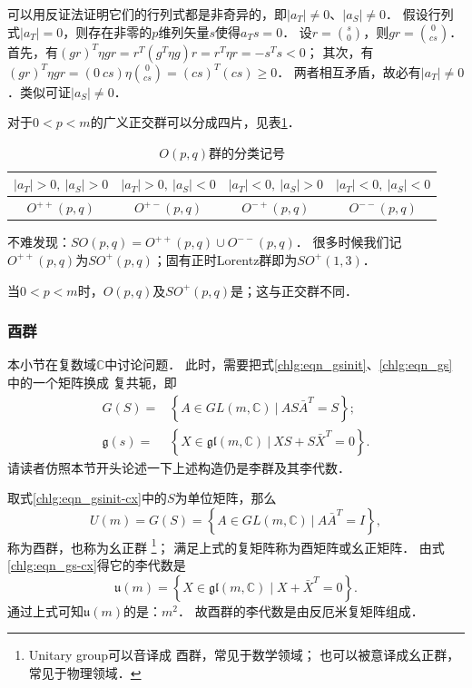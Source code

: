 可以用反证法证明它们的行列式都是非奇异的，即$|a_T| \neq 0$、$|a_S| \neq 0$．
假设行列式$|a_T| = 0$，则存在非零的$p$维列矢量$s$使得$a_T s =0$．
设$r=\binom{s}{0}$，则$gr=\binom{0}{cs}$．
首先，有$(gr)^T \eta gr = r^T (g^T \eta g) r = r^T \eta r = - s^T s <0 $；
其次，有$(gr)^T \eta gr = (0 \  cs) \eta \binom{0}{cs} = (cs)^T (cs)\geqslant 0$．
两者相互矛盾，故必有$|a_T| \neq 0$．类似可证$|a_S| \neq 0$．

对于$0 < p < m$的广义正交群可以分成四片，见表\ref{chlg:tab-GO}．

\begin{table}[htb]
    \centering
    \caption{$O(p,q)$群的分类记号} \label{chlg:tab-GO}
    \begin{tabular}{|*{4}{c|}}
        \hline 
        $| a_T| >0,\ | a_S |>0$ & $ |a_T| >0,\ | a_S |<0$ & $| a_T| <0,\ | a_S| >0$  & $| a_T| <0,\ | a_S| <0$ \\
        \hline
        $O^{++}(p,q)$ & $O^{+-}(p,q)$ & $O^{-+}(p,q)$ & $O^{--}(p,q)$   \\ 
        \hline
    \end{tabular}
\end{table}


不难发现：$SO(p,q)= O^{++}(p,q)\cup O^{--}(p,q)$．
很多时候我们记$O^{++}(p,q)$为$SO^{+}(p,q)$；固有正时Lorentz群即为$SO^{+}(1,3)$．

当$0<p<m$时，$O(p,q)$及$SO^{+}(p,q)$是；这与正交群不同．

    

\subsubsection{酉群}\label{chlg:sec_unitary}

本小节在复数域$\mathbb{C}$中讨论问题．
此时，需要把式\eqref{chlg:eqn_gsinit}、\eqref{chlg:eqn_gs}中的一个矩阵换成
复共轭，即
\begin{align}
    G(S)=& \left\{ A \in GL(m,\mathbb{C})\ |\  A S \bar{A}^T =S \right\};\label{chlg:eqn_gsinit-cx} \\
    \mathfrak{g}(s) =& \left\{ X \in \mathfrak{gl}(m,\mathbb{C}) \ |\ 
    X S + S \bar{X}^T = 0 \right\} . \label{chlg:eqn_gs-cx}
\end{align}
请读者仿照本节开头论述一下上述构造仍是李群及其李代数．

取式\eqref{chlg:eqn_gsinit-cx}中的$S$为单位矩阵，那么
\begin{equation}\label{chlg:eqn_unitary}
    U(m)=G(S)= \left\{ A \in GL(m,\mathbb{C})\ |\ A \bar{A}^T =I \right\},
\end{equation}
称为{\heiti 酉群}，也称为{\heiti 幺正群}
\footnote{Unitary group可以音译成 {\kaishu 酉群}，常见于数学领域；
    也可以被意译成{\kaishu 幺正群}，常见于物理领域．}；
满足上式的复矩阵称为{\heiti 酉矩阵}或{\heiti 幺正矩阵}．
由式\eqref{chlg:eqn_gs-cx}得它的李代数是
\begin{equation}
    \mathfrak{u}(m)= \left\{ X \in  \mathfrak{gl}(m,\mathbb{C}) \mid X  + \bar{X}^T =0 \right\}.
\end{equation}
通过上式可知$\mathfrak{u}(m)$的是：$m^2$．
故酉群的李代数是由反厄米复矩阵组成．

